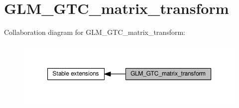 \hypertarget{group__gtc__matrix__transform}{}\section{G\+L\+M\+\_\+\+G\+T\+C\+\_\+matrix\+\_\+transform}
\label{group__gtc__matrix__transform}
Collaboration diagram for G\+L\+M\+\_\+\+G\+T\+C\+\_\+matrix\+\_\+transform\+:
\nopagebreak
\begin{figure}[H]
\begin{center}
\leavevmode
\includegraphics[width=350pt]{dc/d1c/group__gtc__matrix__transform}
\end{center}
\end{figure}

